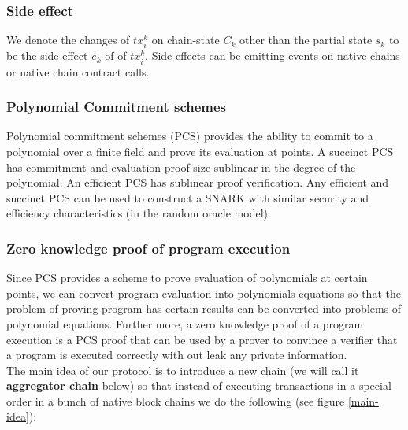 \documentclass[pageno]{jpaper}
\begin{document}
\subsubsection{Side effect}
We denote the changes of $tx_i^k$ on chain-state $C_k$ other than the partial state $s_k$ to be the side effect $e_k$ of of $tx_i^k$. Side-effects can be emitting events on native chains or native chain contract calls.
\\
\subsubsection{Polynomial Commitment schemes}
Polynomial commitment schemes (PCS) provides the ability to commit to a polynomial over a finite field and prove its evaluation at points\cite{boneh2021halo}. A succinct PCS has commitment and evaluation proof size sublinear in the degree of the polynomial. An efficient PCS has sublinear proof verification. Any efficient and succinct PCS can be used to construct a SNARK with similar security and efficiency characteristics (in the random oracle model).
\\
\subsubsection{Zero knowledge proof of program execution}
Since PCS provides a scheme to prove evaluation of polynomials at certain points, we can convert program evaluation into polynomials equations so that the problem of proving program has certain results can be converted into problems of polynomial equations. Further more, a zero knowledge proof of a program execution is a PCS proof that can be used by a prover to convince a verifier that a program is executed correctly with out leak any private information.\\
\newline
The main idea of our protocol is to introduce a new chain (we will call it {\bf aggregator chain} below) so that instead of executing transactions in a special order in a bunch of native block chains we do the following (see figure \ref{main-idea}):
\end{document}
